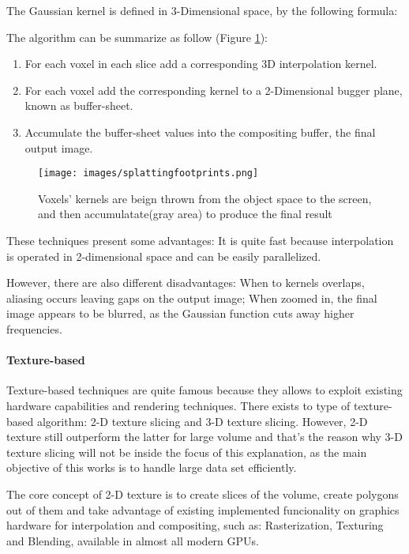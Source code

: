 \documentclass[12pt,a4paper]{extarticle}
\newcommand{\linespace}{\vspace{8pt}}
\begin{document}
The Gaussian kernel is defined in 3-Dimensional space, by the following formula:
\linespace
\begin{center}
\end{center}
\linespace
The algorithm can be summarize as follow (Figure \ref{fig:splattingfootprints}):
\begin{enumerate}
\item For each voxel in each slice add a corresponding 3D interpolation kernel.
\item For each voxel add the corresponding kernel to a 2-Dimensional bugger plane, known as buffer-sheet.
\item Accumulate the buffer-sheet values into the compositing buffer, the final output image. 
\end{enumerate}

\begin{figure}[hbtp]
\centering
\texttt{[image: images/splattingfootprints.png]}
\caption{Voxels' kernels are beign thrown from the object space to the screen, and then accumulatate(gray area) to produce the final result}
\label{fig:splattingfootprints}
\end{figure}


These techniques present some advantages: It is quite fast because interpolation is operated in 2-dimensional space and can be easily parallelized.


However, there are also different disadvantages: When to kernels overlaps, aliasing occurs leaving gaps on the output image; When zoomed in, the final image appears to be blurred, as the Gaussian function cuts away higher frequencies.

\paragraph{Texture-based} Texture-based techniques are quite famous because they allows to exploit existing hardware capabilities and rendering techniques. There exists to type of texture-based algorithm: 2-D texture slicing and 3-D texture slicing. However, 2-D texture still outperform the latter for large volume and that's the reason why 3-D texture slicing will not be inside the focus of this explanation, as the main objective of this works is to handle large data set efficiently.


The core concept of 2-D texture is to create slices of the volume, create polygons out of them and take advantage of existing implemented funcionality on graphics hardware for interpolation and compositing, such as: Rasterization, Texturing and Blending, available in almost all modern GPUs.
\linespace
\end{document}
